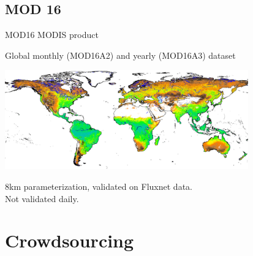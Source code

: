 \documentclass[xcolor=dvipsnames,beamer]{beamer} %
\begin{document}
\subsection{MOD 16}
\begin{frame}[fragile]{MOD16 MODIS product}

Global monthly (MOD16A2) and yearly (MOD16A3) dataset
\begin{center}
 \includegraphics[width=10.5cm]{MOD16_2000.png}
\end{center}
8km parameterization, validated on Fluxnet data.\\
Not validated daily.
\end{frame}


\section{Crowdsourcing}
\end{document}
